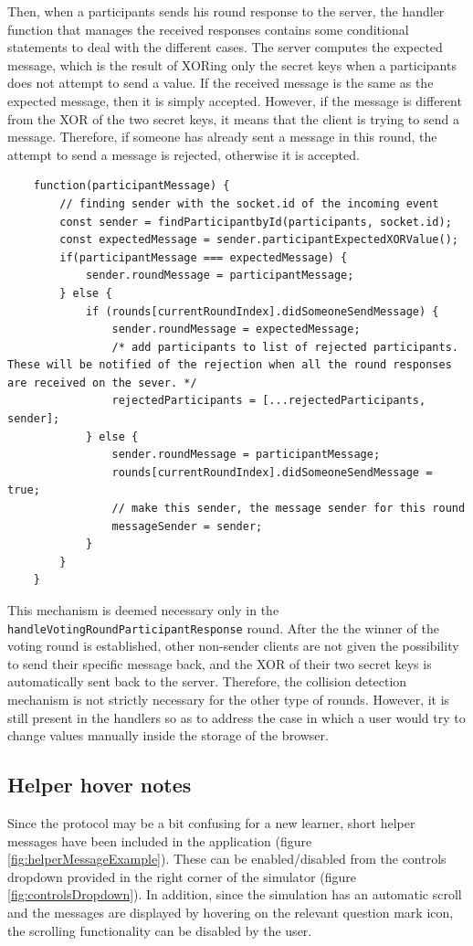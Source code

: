 Then, when a participants sends his round response to the server, the handler function that manages the received responses contains some conditional statements to deal with the different cases. The server computes the expected message, which is the result of XORing only the secret keys when a participants does not attempt to send a value. If the received message is the same as the expected message, then it is simply accepted. However, if the message is different from the XOR of the two secret keys, it means that the client is trying to send a message. Therefore, if someone has already sent a message in this round, the attempt to send a message is rejected, otherwise it is accepted.

\begin{lstlisting}
    function(participantMessage) {
        // finding sender with the socket.id of the incoming event
        const sender = findParticipantbyId(participants, socket.id);
        const expectedMessage = sender.participantExpectedXORValue();
        if(participantMessage === expectedMessage) {
            sender.roundMessage = participantMessage;
        } else {
            if (rounds[currentRoundIndex].didSomeoneSendMessage) {
                sender.roundMessage = expectedMessage;
                /* add participants to list of rejected participants. These will be notified of the rejection when all the round responses are received on the sever. */
                rejectedParticipants = [...rejectedParticipants, sender];
            } else {
                sender.roundMessage = participantMessage;
                rounds[currentRoundIndex].didSomeoneSendMessage = true;
                // make this sender, the message sender for this round
                messageSender = sender;
            }
        }
    }
\end{lstlisting}

This mechanism is deemed necessary only in the \lstinline{handleVotingRoundParticipantResponse} round. After the the winner of the voting round is established, other non-sender clients are not given the possibility to send their specific message back, and the XOR of their two secret keys is automatically sent back to the server. Therefore, the collision detection mechanism is not strictly necessary for the other type of rounds. However, it is still present in the handlers so as to address the case in which a user would try to change values manually inside the storage of the browser.


\subsection{Helper hover notes}
Since the protocol may be a bit confusing for a new learner, short helper messages have been included in the application (figure \ref{fig:helperMessageExample}). These can be enabled/disabled from the controls dropdown provided in the right corner of the simulator (figure \ref{fig:controlsDropdown}). In addition, since the simulation has an automatic scroll and the messages are displayed by hovering on the relevant question mark icon, the scrolling functionality can be disabled by the user.

